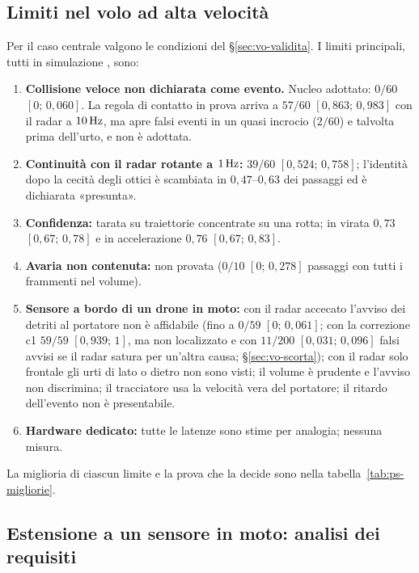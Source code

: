 \subsection{Limiti nel volo ad alta velocità}\label{sec:lim-volo}

Per il caso centrale valgono le condizioni del \S\ref{sec:vo-validita}. I limiti principali, tutti in simulazione , sono:
\begin{enumerate}[label=V\arabic*.,leftmargin=2.2em]
\item \textbf{Collisione veloce non dichiarata come evento.} Nucleo adottato: $0/60$ $[0;\,0{,}060]$. La regola di contatto in prova arriva a $57/60$ $[0{,}863;\,0{,}983]$ con il radar a $10\,\mathrm{Hz}$, ma apre falsi eventi in un quasi incrocio ($2/60$) e talvolta prima dell'urto, e non è adottata.
\item \textbf{Continuità con il radar rotante a $1\,\mathrm{Hz}$:} $39/60$ $[0{,}524;\,0{,}758]$; l'identità dopo la cecità degli ottici è scambiata in $0{,}47$--$0{,}63$ dei passaggi ed è dichiarata «presunta».
\item \textbf{Confidenza:} tarata su traiettorie concentrate su una rotta; in virata $0{,}73$ $[0{,}67;\,0{,}78]$ e in accelerazione $0{,}76$ $[0{,}67;\,0{,}83]$.
\item \textbf{Avaria non contenuta:} non provata ($0/10$ $[0;\,0{,}278]$ passaggi con tutti i frammenti nel volume).
\item \textbf{Sensore a bordo di un drone in moto:} con il radar accecato l'avviso dei detriti al portatore non è affidabile (fino a $0/59$ $[0;\,0{,}061]$; con la correzione c1 $59/59$ $[0{,}939;\,1]$, ma non localizzato e con $11/200$ $[0{,}031;\,0{,}096]$ falsi avvisi se il radar satura per un'altra causa; \S\ref{sec:vo-scorta}); con il radar solo frontale gli urti di lato o dietro non sono visti; il volume è prudente e l'avviso non discrimina; il tracciatore usa la velocità vera del portatore; il ritardo dell'evento non è presentabile.
\item \textbf{Hardware dedicato:} tutte le latenze sono stime per analogia; nessuna misura.
\end{enumerate}
La miglioria di ciascun limite e la prova che la decide sono nella tabella~\ref{tab:ps-migliorie}.

\subsection{Estensione a un sensore in moto: analisi dei requisiti}\label{sec:lim-moto}

